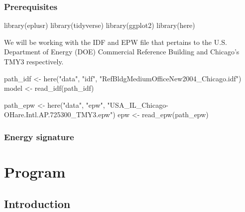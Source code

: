 \documentclass[
]{book}
\newenvironment{Shaded}{\begin{snugshade}}{\end{snugshade}}
\newcommand{\FunctionTok}[1]{\textcolor[rgb]{0.00,0.00,0.00}{#1}}
\newcommand{\NormalTok}[1]{#1}
\newcommand{\OtherTok}[1]{\textcolor[rgb]{0.56,0.35,0.01}{#1}}
\newcommand{\StringTok}[1]{\textcolor[rgb]{0.31,0.60,0.02}{#1}}
\begin{document}
\hypertarget{prerequisites-13}{%
\section{Prerequisites}\label{prerequisites-13}}

\begin{Shaded}
\begin{Highlighting}[]
\FunctionTok{library}\NormalTok{(eplusr)}
\FunctionTok{library}\NormalTok{(tidyverse)}
\FunctionTok{library}\NormalTok{(ggplot2)}
\FunctionTok{library}\NormalTok{(here)}
\end{Highlighting}
\end{Shaded}

We will be working with the IDF and EPW file that pertains to the U.S. Department of Energy (DOE) Commercial Reference Building and Chicago's TMY3 respectively.

\begin{Shaded}
\begin{Highlighting}[]
\NormalTok{path\_idf }\OtherTok{\textless{}{-}} \FunctionTok{here}\NormalTok{(}\StringTok{"data"}\NormalTok{, }\StringTok{"idf"}\NormalTok{, }\StringTok{"RefBldgMediumOfficeNew2004\_Chicago.idf"}\NormalTok{)}
\NormalTok{model }\OtherTok{\textless{}{-}} \FunctionTok{read\_idf}\NormalTok{(path\_idf)}

\NormalTok{path\_epw }\OtherTok{\textless{}{-}} \FunctionTok{here}\NormalTok{(}\StringTok{"data"}\NormalTok{, }\StringTok{"epw"}\NormalTok{, }\StringTok{"USA\_IL\_Chicago{-}OHare.Intl.AP.725300\_TMY3.epw"}\NormalTok{)}
\NormalTok{epw }\OtherTok{\textless{}{-}} \FunctionTok{read\_epw}\NormalTok{(path\_epw)}
\end{Highlighting}
\end{Shaded}

\hypertarget{energy-signature}{%
\section{Energy signature}\label{energy-signature}}

\hypertarget{part-program}{%
\part{Program}\label{part-program}}

\hypertarget{program}{%
\chapter{Introduction}\label{program}}
\end{document}
